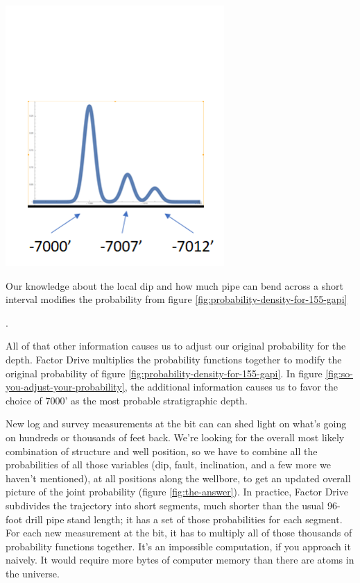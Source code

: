 \documentclass{tufte-handout}
\begin{document}
\begin{marginfigure}
  \includegraphics{so-you-adjust-your-probability.png}
   \caption{Our knowledge about the local dip and how much pipe can bend across a short interval 
  modifies the probability from figure \ref{fig:probability-density-for-155-gapi}}.
  \label{fig:so-you-adjust-your-probability}
\end{marginfigure}

All of that other information causes us to adjust our original probability for the 
depth. Factor Drive multiplies the probability functions together to modify the original
probability of figure \ref{fig:probability-density-for-155-gapi}. In figure \ref{fig:so-you-adjust-your-probability}, the additional information causes us to favor
the choice of 7000' as the most probable stratigraphic depth.


New log and survey measurements at the bit can can shed light on what's going on hundreds or thousands of feet back. We're looking for the overall most likely combination of structure and
well position, so we have to combine all the probabilities of all those variables (dip, fault,
inclination, and a few more we haven't mentioned), at all positions along the wellbore, to get
an updated overall picture of the joint probability (figure \ref{fig:the-answer}).
In practice, Factor Drive subdivides the trajectory into short segments,
much shorter than the usual 96-foot drill pipe stand length; it has a set of those
probabilities for each segment. For each new measurement at the bit, it has to multiply 
all of those thousands of probability functions together. It's an impossible computation, if
you approach it naively. It would require more bytes of computer memory than there are
atoms in the universe.
\end{document}
